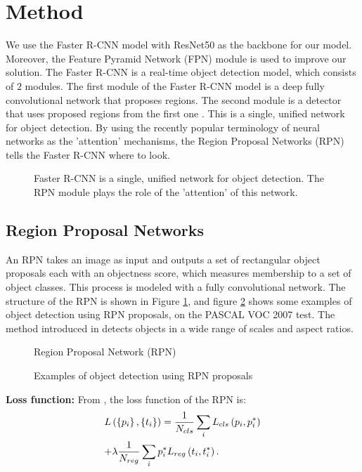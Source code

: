 \section{Method}
We use the Faster R-CNN model with ResNet50 as the backbone for our model. Moreover, the Feature Pyramid Network (FPN) module is used to improve our solution. The Faster R-CNN is a real-time object detection model, which consists of $2$ modules. The first module of the Faster R-CNN model is a deep fully convolutional network that proposes regions. The second module is a detector that uses proposed regions from the first one \cite{f-rcnn}. This is a single, unified network for object detection. By using the recently popular terminology of neural networks as the 'attention' mechanisms, the Region Proposal Networks (RPN) tells the Faster R-CNN where to look.

\begin{figure}[H]
\caption{Faster R-CNN is a single, unified network for object detection. The RPN module plays the role of the 'attention' of this network. \cite{f-rcnn}}
\end{figure}
\newpage
\subsection{Region Proposal Networks}
An RPN takes an image as input and outputs a set of rectangular object proposals each with an objectness score, which measures membership to a set of object classes. This process is modeled with a fully convolutional network. The structure of the RPN is shown in Figure \ref{rpn}, and figure \ref{rpn_example} shows some examples of object detection using RPN proposals, on the PASCAL VOC 2007 test. The method introduced in  \cite{f-rcnn} detects objects in a wide range of scales and aspect ratios.

\begin{figure}[H]
\caption{Region Proposal Network (RPN) \cite{f-rcnn}}
\label{rpn}
\end{figure}

\begin{figure}[H]
\caption{Examples of object detection using RPN proposals \cite{f-rcnn}}
\label{rpn_example}
\end{figure}

\textbf{Loss function:} From \cite{f-rcnn}, the loss function of the RPN is:
$$\begin{gathered}
L\left( {\left\{ {{p_i}} \right\},\left\{ {{t_i}} \right\}} \right) = \frac{1}{{{N_{cls}}}}\sum\limits_i {{L_{cls}}\left( {{p_i},p_i^*} \right)}  \hfill \\
 + \lambda \frac{1}{{{N_{reg}}}}\sum\limits_i {p_i^*} {L_{reg}}\left( {{t_i},t_i^*} \right). \hfill \\
\end{gathered} $$

